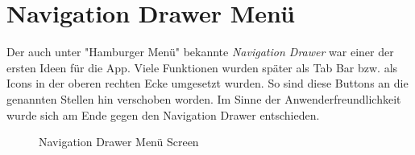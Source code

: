 \documentclass[
    DIV12,
    cleardouble=plain,
    headings=normal,
    pdftex,
    headexclude,footexclude,
    final
]{scrreprt}
\begin{document}
\section{Navigation Drawer Menü}
Der auch unter "Hamburger Menü" bekannte \textit{Navigation Drawer} war einer der ersten Ideen für die App. Viele Funktionen wurden später als Tab Bar bzw. als Icons in der oberen rechten Ecke umgesetzt wurden. So sind diese Buttons an die genannten Stellen hin verschoben worden. Im Sinne der Anwenderfreundlichkeit wurde sich am Ende gegen den Navigation Drawer entschieden.
\begin{figure}[H]
	\centering
	\caption{Navigation Drawer Menü Screen}
	\label{main_burger}
\end{figure}

\newpage
\end{document}
